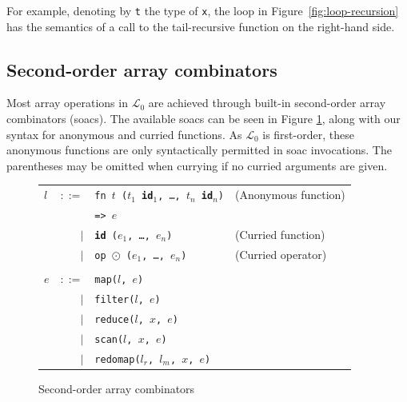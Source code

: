 \documentclass{sigplanconf}  %
\newcommand{\LO}{$\mathcal{L}_0$}
\begin{document}

For example, denoting by {\tt t} the type of {\tt x}, the loop in
Figure~\ref{fig:loop-recursion} has the semantics of a call to the
tail-recursive function on the right-hand side.

\subsection{Second-order array combinators}
\label{sec:soacs}

Most array operations in \LO{} are achieved through built-in second-order
array combinators ({\sc soac}s).  The available {\sc soac}s can be seen in Figure
\ref{fig:soacs}, along with our syntax for anonymous and curried
functions.  As \LO{} is first-order, these anonymous functions are
only syntactically permitted in {\sc soac} invocations.  The parentheses may
be omitted when currying if no curried arguments are given.

\begin{figure}[bt]
\begin{tabular}{lrll}
$l$ & $::=$ & {\tt fn $t$ ($t_{1}$ {\bf id}$_{1}$, \ldots, $t_{n}$ {\bf id}$_{n}$)} & (Anonymous function) \\
&     & {\tt => $e$} \\
& $|$ & {\tt {\bf id} ($e_{1}$, \ldots, $e_{n}$)} & (Curried function) \\
& $|$ & {\tt op $\odot$ ($e_{1}$, \ldots, $e_{n}$)} & (Curried operator) \\
\\
$e$ & $::=$ & {\tt map($l$, $e$)} \\
    & $|$ & {\tt filter($l$, $e$)} \\
    & $|$ & {\tt reduce($l$, $x$, $e$)} \\
    & $|$ & {\tt scan($l$, $x$, $e$)} \\
    & $|$ & {\tt redomap($l_{r}$, $l_{m}$, $x$, $e$)} \\
\end{tabular}
\caption{Second-order array combinators}
\label{fig:soacs}
\end{figure}
\end{document}
